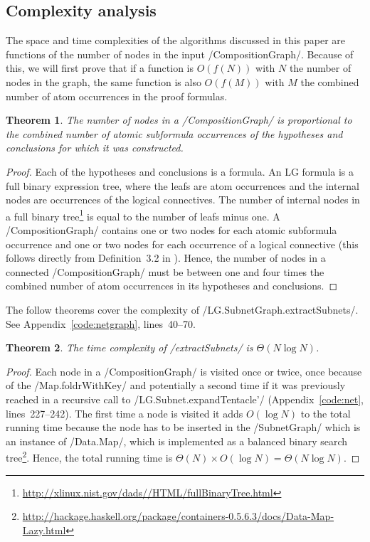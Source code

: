 \documentclass[12pt,a4paper]{article}
\newtheorem{theorem}{Theorem}
\begin{document}
\subsection{Complexity analysis}

The space and time complexities of the algorithms discussed in this paper are functions of the number of nodes in the input \hs/CompositionGraph/. Because of this, we will first prove that if a function is $O(f(N))$ with $N$ the number of nodes in the graph, the same function is also $O(f(M))$ with $M$ the combined number of atom occurrences in the proof formulas.
\begin{theorem}\label{thm:nodes}
    The number of nodes in a \hs/CompositionGraph/ is proportional to the combined number of atomic subformula occurrences of the hypotheses and conclusions for which it was constructed.
\end{theorem}
\begin{proof}
    Each of the hypotheses and conclusions is a formula. An LG formula is a full binary expression tree, where the leafs are atom occurrences and the internal nodes are occurrences of the logical connectives. The number of internal nodes in a full binary tree\footnote{\url{http://xlinux.nist.gov/dads//HTML/fullBinaryTree.html}} is equal to the number of leafs minus one. A \hs/CompositionGraph/ contains one or two nodes for each atomic subformula occurrence and one or two nodes for each occurrence of a logical connective (this follows directly from Definition~3.2 in \cite[p.~23]{mm12}). Hence, the number of nodes in a connected \hs/CompositionGraph/ must be between one and four times the combined number of atom occurrences in its hypotheses and conclusions.
\end{proof}

The follow theorems cover the complexity of \hs/LG.SubnetGraph.extractSubnets/. See Appendix~\ref{code:netgraph}, lines~40--70.
\begin{theorem}\label{thm:netgraph-time}
    The time complexity of \hs/extractSubnets/ is $\Theta(N \log N)$.
\end{theorem}
\begin{proof}
    Each node in a \hs/CompositionGraph/ is visited once or twice, once because of the \hs/Map.foldrWithKey/ and potentially a second time if it was previously reached in a recursive call to \hs/LG.Subnet.expandTentacle'/ (Appendix~\ref{code:net}, lines~227--242). The first time a node is visited it adds $O(\log N)$ to the total running time because the node has to be inserted in the \hs/SubnetGraph/ which is an instance of \hs/Data.Map/, which is implemented as a balanced binary search tree\footnote{\url{http://hackage.haskell.org/package/containers-0.5.6.3/docs/Data-Map-Lazy.html}}. Hence, the total running time is $\Theta(N)\times O(\log N) = \Theta(N\log N)$.
\end{proof}
\end{document}
